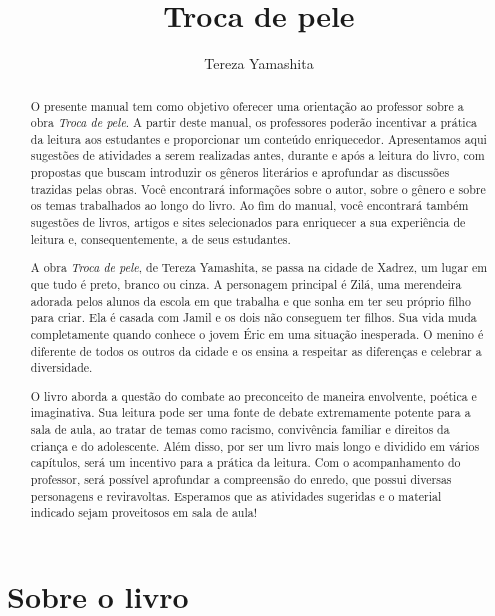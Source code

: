 \documentclass[11pt]{extarticle}
\newcommand{\AutorLivro}{Tereza Yamashita}
\newcommand{\TituloLivro}{Troca de pele}
\newcommand{\colaborador}{Ana Lancman}
\begin{document}
\title{\TituloLivro}
\author{\AutorLivro}
\def\authornotes{\colaborador}

\date{}
\maketitle

\tableofcontents


\begin{abstract}


O presente manual tem como objetivo oferecer uma orientação ao professor sobre a obra \textit{Troca de pele}. A partir deste manual, os professores poderão incentivar a prática da leitura aos estudantes e proporcionar um conteúdo enriquecedor. Apresentamos aqui sugestões de atividades a serem realizadas antes, durante e após a leitura do livro, com propostas que buscam introduzir os gêneros literários e aprofundar as discussões trazidas pelas obras. Você encontrará informações sobre o autor, sobre o gênero e sobre os temas trabalhados ao longo do livro. Ao fim do manual, você encontrará também sugestões de livros, artigos e sites selecionados para enriquecer a sua experiência de leitura e, consequentemente, a de seus estudantes.

A obra \textit{Troca de pele}, de Tereza Yamashita, se passa na cidade de Xadrez, um lugar em que tudo é preto, branco ou cinza. A personagem principal é Zilá, uma merendeira adorada pelos alunos da escola em que trabalha e que sonha em ter seu próprio filho para criar. Ela é casada com Jamil e os dois não conseguem ter filhos. Sua vida muda completamente quando conhece o jovem Éric em uma situação inesperada. O menino é diferente de todos os outros da cidade e os ensina a respeitar as diferenças e celebrar a diversidade.

O livro aborda a questão do combate ao preconceito de maneira envolvente, poética e imaginativa. Sua leitura pode ser uma fonte de debate extremamente potente para a sala de aula, ao tratar de temas como racismo, convivência familiar e direitos da criança e do adolescente. Além disso, por ser um livro mais longo e dividido em vários capítulos, será um incentivo para a prática da leitura. Com o acompanhamento do professor, será possível aprofundar a compreensão do enredo, que possui diversas personagens e reviravoltas. Esperamos que as atividades sugeridas e o material indicado sejam proveitosos em sala de aula! 

\end{abstract}

\section{Sobre o livro} 
\end{document}
